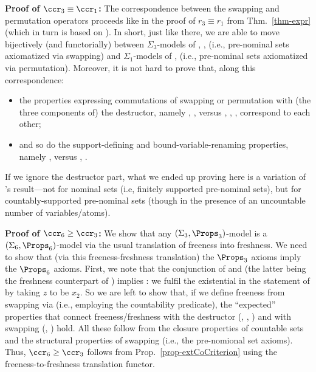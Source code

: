 \textbf{Proof of $\ccr_3 \equiv \ccr_1$:} 
%
The correspondence between the swapping and permutation operators 
proceeds %
like in the proof of $r_3 \equiv r_1$ from Thm.~\ref{thm-expr} (which in turn is based on 
\cite[Section 6.1]{pitts_2013}). In short, just like there, we are able to move bijectively (and functorially) 
between $\Sigma_3$-models of \ISwId{}, \ISwIv{}, \ISwCp{} (i.e., pre-nominal sets axiomatized via swapping) 
and $\Sigma_1$-models of \IPmId{}, \IPmCp{} (i.e., pre-nominal sets axiomatized via permutation). 
Moreover, it is not hard to prove that, along this correspondence:
\begin{itemize}
	\item the properties expressing commutations of swapping or permutation with (the three components of) the 
	destructor, namely \ISwVr{}, \ISwAp{}, \ISwAp{} versus \IPmVr{}, \IPmAp{}, \IPmAp{}, correspond to each other;
	\item and so do the support-defining and bound-variable-renaming properties, namely \IFvDSw{}, \ISwBvrT{} versus 
	\IFvDPm{}, \IPmBvr{}. 
\end{itemize}
%
If we ignore the destructor part, what we ended up proving here is a variation of \citet{pitts_2013}'s result---not for nominal sets (i.e, finitely supported pre-nominal sets), but for 
countably-supported pre-nominal sets (though in the presence of an uncountable number of variables/atoms). 

\textbf{Proof of $\ccr_6 \geq \ccr_3$:}  We show that any $(\Sigma_3,\Props_3)$-model is 
a $(\Sigma_6,\Props_6)$-model via the usual translation of freeness into freshness. 
We need to show that (via this freeness-freshness translation) 
the $\Props_3$ axioms imply the $\Props_6$ axioms. 
First, we note that the conjunction of \ISwId{} and \ISwBvr{} (the latter being the freshness counterpart of \ISwBvrT{}) implies  \ISwCg{}: we fulfil the existential 
in the statement of \ISwCg{} by taking $z$ to be $x_2$. 
%
So we are left to show that, if we define freeness from swapping via \IFvDSw{} (i.e., employing the countability predicate), 
the ``expected'' properties that connect freeness/freshness with the destructor
(\IFrVr{}, \IFrAp{}, \IFrLm{}) and with swapping (\ISwFr{}, \IFrSw{}) hold. 
All these follow from the closure properties of countable sets and the structural properties of swapping (i.e., the pre-nomional 
set axioms). 
Thus, $\ccr_6 \geq \ccr_3$ follows from Prop.~\ref{prop-extCoCriterion} using the freeness-to-freshness translation functor. 


